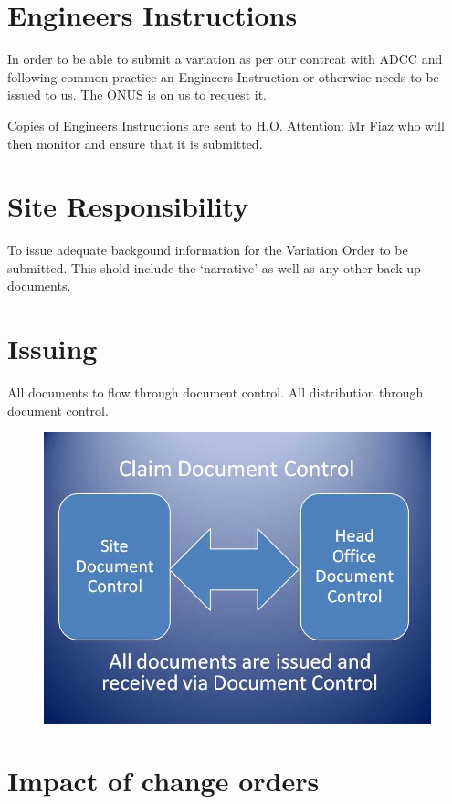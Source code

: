 \section*{Engineers Instructions}

In order to be able to submit a variation as per our contrcat with ADCC and following common practice an Engineers Instruction or otherwise needs to be issued to us. The ONUS is on us to request it.

Copies of Engineers Instructions are sent to H.O. Attention: Mr Fiaz who will then monitor and ensure that it is submitted.

\section*{Site Responsibility}

To issue adequate backgound information for the Variation Order to be submitted. This shold include the `narrative' as well as any other back-up documents.


\section*{Issuing}

All documents to flow through document control. All distribution through document control.

\begin{figure}
\includegraphics[width=1.3\textwidth]{./graphics/document-control-01}
\end{figure}


\section*{Impact of change orders}

